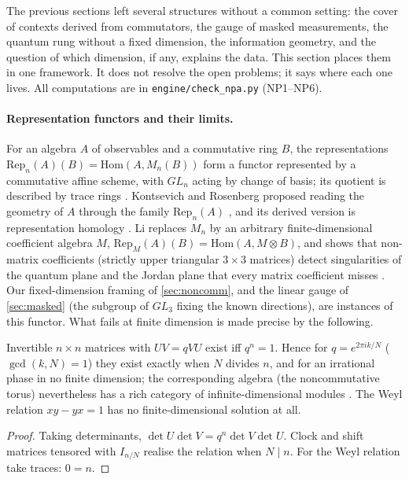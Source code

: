 \documentclass[11pt]{article}
\theoremstyle{definition}\newtheorem{definition}[theorem]{Definition}\newtheorem{remark}[theorem]{Remark}\newtheorem{example}[theorem]{Example}
\begin{document}
The previous sections left several structures without a common setting: the cover of contexts derived from commutators, the gauge of masked
measurements, the quantum rung without a fixed dimension, the information geometry, and the question of which dimension, if any, explains the
data. This section places them in one framework. It does not resolve the open problems; it says where each one lives. All computations are in
\texttt{engine/check\_npa.py} (NP1--NP6).

\paragraph{Representation functors and their limits.}
For an algebra $A$ of observables and a commutative ring $B$, the representations $\mathrm{Rep}_n(A)(B)=\mathrm{Hom}(A,M_n(B))$ form a functor
represented by a commutative affine scheme, with $GL_n$ acting by change of basis; its quotient is described by trace rings
\cite{Procesi1976}. Kontsevich and Rosenberg proposed reading the geometry of $A$ through the family $\mathrm{Rep}_n(A)$ \cite{KontsevichRosenberg2000},
and its derived version is representation homology \cite{BerestFelderRamadoss2014}. Li replaces $M_n$ by an arbitrary finite-dimensional
coefficient algebra $M$, $\mathrm{Rep}_M(A)(B)=\mathrm{Hom}(A,M\otimes B)$, and shows that non-matrix coefficients (strictly upper triangular
$3\times3$ matrices) detect singularities of the quantum plane and the Jordan plane that every matrix coefficient misses \cite{Li2026}. Our
fixed-dimension framing of \cref{sec:noncomm}, and the linear gauge of \cref{sec:masked} (the subgroup of $GL_3$ fixing the known
directions), are instances of this functor. What fails at finite dimension is made precise by the following.

\begin{proposition}\label{prop:holdim}
Invertible $n\times n$ matrices with $UV=qVU$ exist iff $q^n=1$. Hence for $q=e^{2\pi ik/N}$ ($\gcd(k,N)=1$) they exist exactly when $N$
divides $n$, and for an irrational phase in no finite dimension; the corresponding algebra (the noncommutative torus) nevertheless has a rich
category of infinite-dimensional modules \cite{Rieffel1981,Connes1994}. The Weyl relation $xy-yx=1$ has no finite-dimensional solution at all.
\end{proposition}

\begin{proof}
Taking determinants, $\det U\det V=q^n\det V\det U$. Clock and shift matrices tensored with $I_{n/N}$ realise the relation when $N\mid n$.
For the Weyl relation take traces: $0=n$.
\end{proof}
\end{document}
